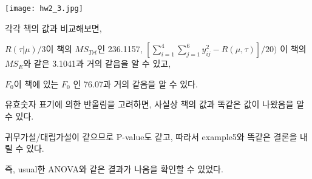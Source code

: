 \documentclass{article}
\begin{document}
\begin{center}
    \texttt{[image: hw2\_3.jpg]}
\end{center} 

각각 책의 값과 비교해보면,

$R(\tau | \mu) / 3$이 책의 $MS_{Trt}$인 236.1157,
$[\sum_{i=1}^{4} \sum_{j=1}^6 y_{ij}^2 - R(\mu,\tau)] / 20)$ 이 책의 $MS_{E}$와 같은 3.1041과 거의 같음을 알 수 있고,

$F_0$이 책에 있는 $F_0$ 인 76.07과 거의 같음을 알 수 있다.

유효숫자 표기에 의한 반올림을 고려하면, 사실상 책의 값과 똑같은 값이 나왔음을 알 수 있다.

귀무가설/대립가설이 같으므로 P-value도 같고, 따라서 example5와 똑같은 결론을 내릴 수 있다.

즉, usual한 ANOVA와 같은 결과가 나옴을 확인할 수 있었다.
\end{document}
